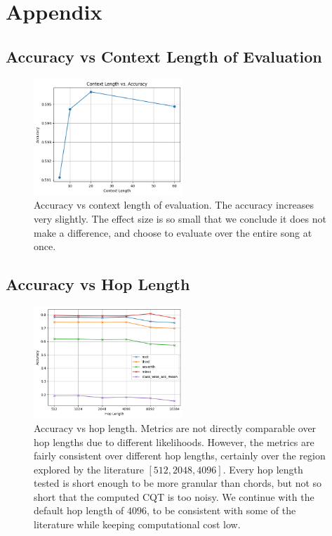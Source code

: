 
\appendix

\chapter{Appendix}

\section{Accuracy vs Context Length of Evaluation}\label{app:accuracy_vs_context_length}

\begin{figure}[H]
    \centering
    \includegraphics[width=0.5\textwidth]{figures/context_length_vs_accuracy.png}
    \caption{Accuracy vs context length of evaluation. The accuracy increases very slightly. The effect size is so small that we conclude it does not make a difference, and choose to evaluate over the entire song at once.}
    \label{fig:accuracy_vs_context_length}
\end{figure}

\section{Accuracy vs Hop Length}\label{app:accuracy_vs_hop_length}

\begin{figure}[H]
    \centering
    \includegraphics[width=0.5\textwidth]{figures/hop_length_vs_accuracy.png}
    \caption{Accuracy vs hop length. Metrics are not directly comparable over hop lengths due to different likelihoods. However, the metrics are fairly consistent over different hop lengths, certainly over the region explored by the literature $[512,2048,4096]$. Every hop length tested is short enough to be more granular than chords, but not so short that the computed CQT is too noisy. We continue with the default hop length of $4096$, to be consistent with some of the literature while keeping computational cost low.}
    \label{fig:accuracy_vs_hop_length}
\end{figure}

